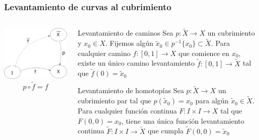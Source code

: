 \documentclass[xetex,mathserif,serif]{beamer}
\begin{document}
  \begin{frame}
    \frametitle{Levantamiento de curvas al cubrimiento}
    \begin{columns}
      \begin{column}{.4\textwidth}
        \centering
        \includegraphics[scale=0.3]{../tesis/imagenes/lifting-path.png}
        \[ p \circ \tilde f = f \]
      \end{column}
    \begin{column}{.6\textwidth}

      \begin{block}{Levantamiento de caminos}
        Sea \(p : \tilde X \to X\) un cubrimiento y \(x_0 \in X\).
        Fijemos algún \(\tilde x _0 \in p^{-1} \{x_0\} \subset \tilde
        X\). Para cualquier camino \(f : [0,1] \to X\) que comience en \(x_0\),
        existe un único camino levantamiento \(\tilde f : [0,1] \to \tilde X\)
        tal que \(\tilde f (0) = \tilde x _0\)
      \end{block}

      \pause

      \begin{block}{Levantamiento de homotopías}
        Sea \(p : \tilde X \to X\) un cubrimiento par tal que \(p(\tilde
        x _0) = x_0 \) para algún \(\tilde x _0 \in \tilde X\). Para cualquier
        función continua \(F : I \times I \to X\) tal que \(F(0,0) = x_0\),
        tiene una única función levantamiento continua \(\tilde F : I \times I
        \to \tilde X\) que cumpla \(\tilde F (0,0) = \tilde x_0\)
      \end{block}
    \end{column}
    \end{columns}
  \end{frame}
\end{document}
